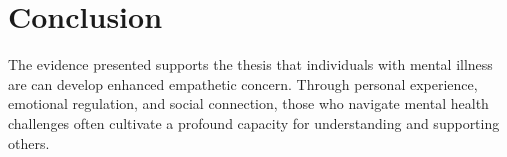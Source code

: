 \documentclass[stu]{apa7}
\begin{document}





\section{Conclusion}

The evidence presented supports the thesis that individuals with mental illness are can develop enhanced empathetic concern. Through personal experience, emotional regulation, and social connection, those who navigate mental health challenges often cultivate a profound capacity for understanding and supporting others.  

\printbibliography
\end{document}
